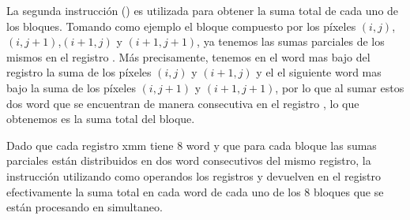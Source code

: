 \begin{itemize}
  La segunda instrucción () es utilizada para obtener la suma total de cada uno de los bloques. Tomando como ejemplo el bloque compuesto por los píxeles $(i,j)$,$(i,j+1)$,$(i+1,j)$ y $(i+1,j+1)$, ya tenemos las sumas parciales de los mismos en el registro . Más precisamente, tenemos en el word mas bajo del registro la suma de los píxeles $(i,j)$ y $(i+1,j)$ y el el siguiente word mas bajo la suma de los píxeles $(i,j+1)$ y $(i+1,j+1)$, por lo que al sumar estos dos word que se encuentran de manera consecutiva en el registro , lo que obtenemos es la suma total del bloque. 

  Dado que cada registro xmm tiene $8$ word y que para cada bloque las sumas parciales están distribuidos en dos word consecutivos del mismo registro, la instrucción  utilizando como operandos los registros  y  devuelven en el registro  efectivamente la suma total en cada word de cada uno de los $8$ bloques que se están procesando en simultaneo.

  \begin{figure}[H]
    \centering
\end{figure}
\end{itemize}
